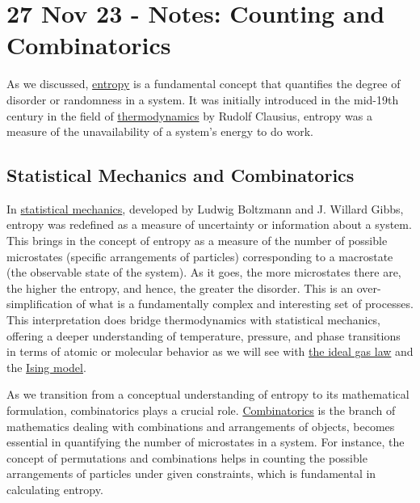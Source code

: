\section{27 Nov 23 - Notes: Counting and
Combinatorics}\label{nov-23---notes-counting-and-combinatorics}

As we discussed, \href{https://en.wikipedia.org/wiki/Entropy}{entropy}
is a fundamental concept that quantifies the degree of disorder or
randomness in a system. It was initially introduced in the mid-19th
century in the field of
\href{https://en.wikipedia.org/wiki/Thermodynamics}{thermodynamics} by
Rudolf Clausius, entropy was a measure of the unavailability of a
system's energy to do work.

\subsection{Statistical Mechanics and
Combinatorics}\label{statistical-mechanics-and-combinatorics}

In
\href{https://en.wikipedia.org/wiki/Statistical_mechanics}{statistical
mechanics}, developed by Ludwig Boltzmann and J. Willard Gibbs, entropy
was redefined as a measure of uncertainty or information about a system.
This brings in the concept of entropy as a measure of the number of
possible microstates (specific arrangements of particles) corresponding
to a macrostate (the observable state of the system). As it goes, the
more microstates there are, the higher the entropy, and hence, the
greater the disorder. This is an over-simplification of what is a
fundamentally complex and interesting set of processes. This
interpretation does bridge thermodynamics with statistical mechanics,
offering a deeper understanding of temperature, pressure, and phase
transitions in terms of atomic or molecular behavior as we will see with
\href{https://en.wikipedia.org/wiki/Ideal_gas_law}{the ideal gas law}
and the \href{https://en.wikipedia.org/wiki/Ising_model}{Ising model}.

As we transition from a conceptual understanding of entropy to its
mathematical formulation, combinatorics plays a crucial role.
\href{https://en.wikipedia.org/wiki/Combinatorics}{Combinatorics} is the
branch of mathematics dealing with combinations and arrangements of
objects, becomes essential in quantifying the number of microstates in a
system. For instance, the concept of permutations and combinations helps
in counting the possible arrangements of particles under given
constraints, which is fundamental in calculating entropy.

